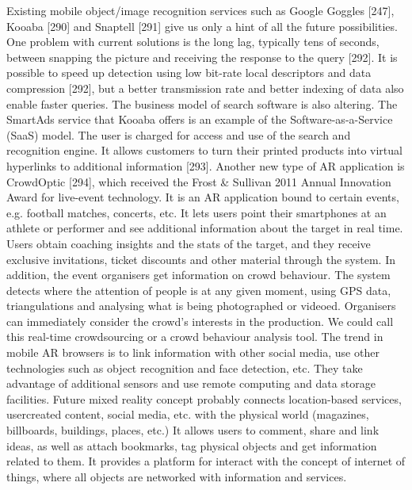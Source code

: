 Existing mobile object/image recognition services such as Google Goggles [247], Kooaba [290] and Snaptell [291] give us only a hint of all the future possibilities. One problem with current solutions is the long lag, typically tens of seconds, between snapping the picture and receiving the response to the query [292]. It is possible to speed up detection using low bit-rate local descriptors and data compression [292], but a better transmission rate and better indexing of data also enable faster queries. The business model of search software is also altering. The SmartAds service that Kooaba offers is an example of the Software-as-a-Service (SaaS) model. The user is charged for access and use of the search and recognition engine. It allows customers to turn their printed products into virtual hyperlinks to additional information [293]. Another new type of AR application is CrowdOptic [294], which received the Frost & Sullivan 2011 Annual Innovation Award for live-event technology. It is an AR application bound to certain events, e.g. football matches, concerts, etc. It lets users point their smartphones at an athlete or performer and see additional information about the target in real time. Users obtain coaching insights and the stats of the target, and they receive exclusive invitations, ticket discounts and other material through the system. In addition, the event organisers get information on crowd behaviour. The system detects where the attention of people is at any given moment, using GPS data, triangulations and analysing what is being photographed or videoed. Organisers can immediately consider the crowd’s interests in the production. We could call this real-time crowdsourcing or a crowd behaviour analysis tool. The trend in mobile AR browsers is to link information with other social media, use other technologies such as object recognition and face detection, etc. They take advantage of additional sensors and use remote computing and data storage facilities. Future mixed reality concept probably connects location-based services, usercreated content, social media, etc. with the physical world (magazines, billboards, buildings, places, etc.) It allows users to comment, share and link ideas, as well as attach bookmarks, tag physical objects and get information related to them. It provides a platform for interact with the concept of internet of things, where all objects are networked with information and services.

